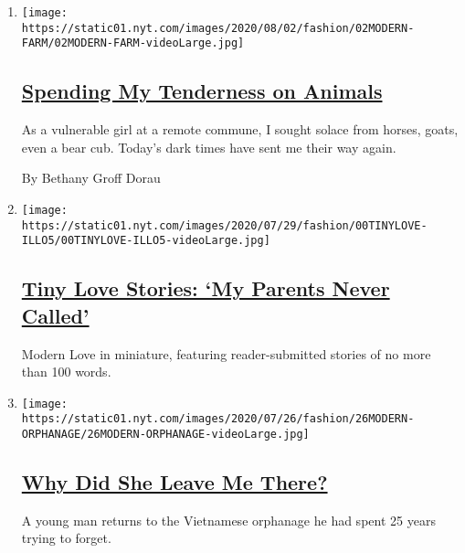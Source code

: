 \begin{enumerate}
\def\labelenumi{\arabic{enumi}.}
\item
  \texttt{[image: https://static01.nyt.com/images/2020/08/02/fashion/02MODERN-FARM/02MODERN-FARM-videoLarge.jpg]}

  \hypertarget{spending-my-tenderness-on-animals}{%
  \subsection{\texorpdfstring{\href{/2020/07/31/style/modern-love-spending-tenderness-on-animals.html}{Spending
  My Tenderness on
  Animals}}{Spending My Tenderness on Animals}}\label{spending-my-tenderness-on-animals}}

  As a vulnerable girl at a remote commune, I sought solace from horses,
  goats, even a bear cub. Today's dark times have sent me their way
  again.

  By Bethany Groff Dorau
\item
  \texttt{[image: https://static01.nyt.com/images/2020/07/29/fashion/00TINYLOVE-ILLO5/00TINYLOVE-ILLO5-videoLarge.jpg]}

  \hypertarget{tiny-love-stories-my-parents-never-called}{%
  \subsection{\texorpdfstring{\href{/2020/07/28/style/tiny-modern-love-stories-coronavirus-my-parents-never-called.html}{Tiny
  Love Stories: `My Parents Never
  Called'}}{Tiny Love Stories: `My Parents Never Called'}}\label{tiny-love-stories-my-parents-never-called}}

  Modern Love in miniature, featuring reader-submitted stories of no
  more than 100 words.
\item
  \texttt{[image: https://static01.nyt.com/images/2020/07/26/fashion/26MODERN-ORPHANAGE/26MODERN-ORPHANAGE-videoLarge.jpg]}

  \hypertarget{why-did-she-leave-me-there}{%
  \subsection{\texorpdfstring{\href{/2020/07/24/style/modern-love-adoption-vietnam-why-did-she-leave-me-there.html}{Why
  Did She Leave Me
  There?}}{Why Did She Leave Me There?}}\label{why-did-she-leave-me-there}}

  A young man returns to the Vietnamese orphanage he had spent 25 years
  trying to forget.


\end{enumerate}
